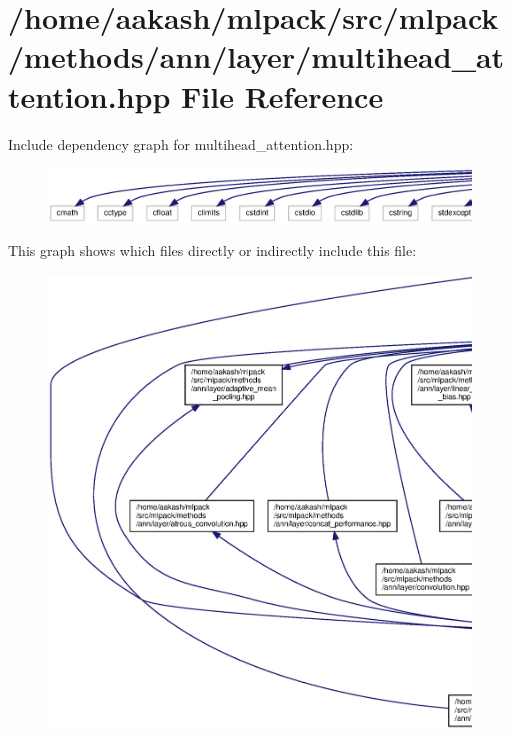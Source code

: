 \section{/home/aakash/mlpack/src/mlpack/methods/ann/layer/multihead\+\_\+attention.hpp File Reference}
\label{multihead__attention_8hpp}
Include dependency graph for multihead\+\_\+attention.\+hpp\+:
\nopagebreak
\begin{figure}[H]
\begin{center}
\leavevmode
\includegraphics[width=350pt]{multihead__attention_8hpp__incl}
\end{center}
\end{figure}
This graph shows which files directly or indirectly include this file\+:
\nopagebreak
\begin{figure}[H]
\begin{center}
\leavevmode
\includegraphics[width=350pt]{multihead__attention_8hpp__dep__incl}
\end{center}
\end{figure}
